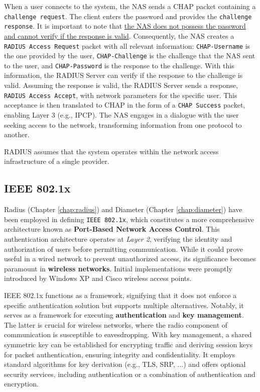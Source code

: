 When a user connects to the system, the NAS sends a CHAP packet containing a \texttt{challenge request}. The client enters the password and provides the \texttt{challenge response}. It is important to note that \underline{the NAS does not possess the password and cannot verify if the response is valid}. Consequently, the NAS creates a \texttt{RADIUS Access Request} packet with all relevant information: \texttt{CHAP-Username} is the one provided by the user, \texttt{CHAP-Challenge} is the challenge that the NAS sent to the user, and \texttt{CHAP-Password} is the response to the challenge. With this information, the RADIUS Server can verify if the response to the challenge is valid. Assuming the response is valid, the RADIUS Server sends a response, \texttt{RADIUS Access Accept}, with network parameters for the specific user. This acceptance is then translated to CHAP in the form of a \texttt{CHAP Success} packet, enabling Layer 3 (e.g., IPCP).
The NAS engages in a dialogue with the user seeking access to the network, transforming information from one protocol to another.

RADIUS assumes that the system operates within the network access infrastructure of a single provider.


\subsection{IEEE 802.1x}\label{chap:802.1x}
Radius (Chapter \ref{chap:radius}) and Diameter (Chapter \ref{chap:diameter}) have been employed in defining \texttt{IEEE 802.1x}, 
which constitutes a more comprehensive architecture known as \textbf{Port-Based Network Access Control}. 
This authentication architecture operates at \textit{Layer 2}, verifying the identity and authorization of users before permitting communication. While it could prove useful in a wired network to prevent unauthorized access, its significance becomes paramount in \textbf{wireless networks}.
Initial implementations were promptly introduced by Windows XP and Cisco wireless access points.

IEEE 802.1x functions as a framework, signifying that it does not enforce a specific authentication solution but supports multiple alternatives. Notably, it serves as a framework for executing \textbf{authentication} and \textbf{key management}. The latter is crucial for wireless networks, where the radio component of communication is susceptible to eavesdropping. With key management, a shared symmetric key can be established for encrypting traffic and deriving session keys for packet authentication, ensuring integrity and confidentiality. It employs standard algorithms for key derivation (e.g., TLS, SRP, ...) and offers optional security services, including authentication or a combination of authentication and encryption.

